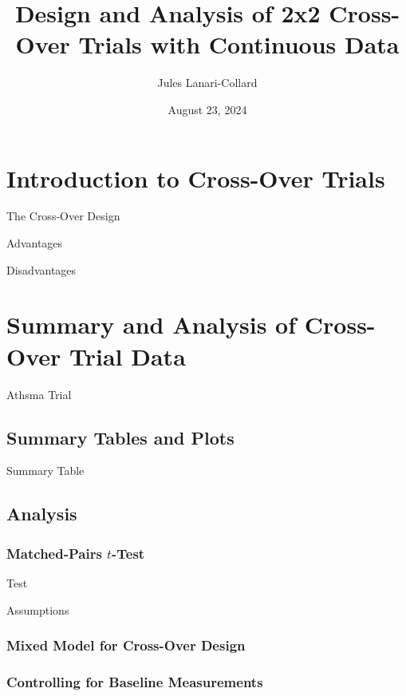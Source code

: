 \documentclass{beamer}
\title{Design and Analysis of 2x2 Cross-Over Trials with Continuous Data}
\author{Jules Lanari-Collard}
\institute{McGill University}
\date{August 23, 2024}
\begin{document}
\frame{\titlepage}

\section{Introduction to Cross-Over Trials}
\begin{frame}{The Cross-Over Design}

\end{frame}

\begin{frame}{Advantages}
    
\end{frame}

\begin{frame}{Disadvantages}
    
\end{frame}

\section{Summary and Analysis of Cross-Over Trial Data}

\begin{frame}{Athsma Trial}
    
\end{frame}

\subsection{Summary Tables and Plots}

\begin{frame}{Summary Table}

\end{frame}

\subsection{Analysis}
\subsubsection{Matched-Pairs $t$-Test}
\begin{frame}{Test}
    
\end{frame}

\begin{frame}{Assumptions}
    
\end{frame}
\subsubsection{Mixed Model for Cross-Over Design}

\subsubsection{Controlling for Baseline Measurements}
\end{document}
